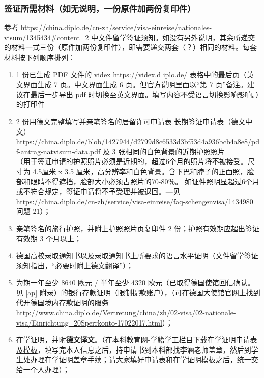 \documentclass{article}
\begin{document}
\subsubsection{签证所需材料（如无说明，一份原件加两份复印件）}\label{sec:visa-material}
参考 \url{https://china.diplo.de/cn-zh/service/visa-einreise/nationales-visum/1345434#content_2} 中文件\href{https://china.diplo.de/blob/1341652/6085aece6f28eb2e16b4d851c3632005/pdf-merkblatt-natvisum-studium-data.pdf}{留学签证须知}。如没有另外说明，其余所递交的材料一式三份（原件加两份复印件），即需要递交两套（？）相同的材料。每套材料按下列顺序排列：
\begin{enumerate}
\item 1 份已生成 PDF 文件的 videx \url{https://videx.d
iplo.de/} 表格中的最后页（英文界面生成 7 页。中文界面生成 6 页。但官方说明里面以“第 7 页”备注。建议在最后一步导出 pdf 时切换至英文界面。填写内容不受语言切换影响影响。）的打印件
\item 2 份用德文完整填写并亲笔签名的居留许可\underline{申请表}%
长期签证申请表（德文中文） \url{https://china.diplo.de/blob/1427944/d2799d8c6533d3bf53d4a936bcb4a8e8/pdf-antrag-natvisum-data.pdf} 及 3 张相同的白色背景的近期\underline{护照照片}\\
（用于签证申请的护照照片必须是近期的，超过6个月的照片将不被接受。尺寸为 4.5厘米 x 3.5 厘米，高分辨率和白色背景。含下巴和脖子的正面照，脸部和眼睛不得遮挡，脸部大小必须占照片的70-80％。
如证件照明显超过6个月或不符合规定，签证申请将不予受理并被退回。---见 \url{https://china.diplo.de/cn-zh/service/visa-einreise/faq-schengenvisa/1434980} 问题 21）；
\item 亲笔签名的\underline{旅行护照}，并附上护照照片页复印件 2 份；护照有效期应超出签证有效期 3 个月以上；
\item 德国高校\underline{录取通知书}以及录取通知书上所要求的语言水平证明（文件\href{https://china.diplo.de/blob/1341652/6085aece6f28eb2e16b4d851c3632005/pdf-merkblatt-natvisum-studium-data.pdf}{留学签证须知}指出，“必要时附上德文翻译”）；
\item \sloppy 为期一年至少 8640 欧元 / 半年至少 4320 欧元（已取得德国使馆回信确认。见 \ref{ap} 附录）的银行存款证明（限制提款账户），（可在德国大使馆官网上找到代开德国境内存款证明的服务 \url{http://www.china.diplo.de/Vertretung/china/zh/02-visa/02-nationale-visa/Einrichtung_20Sperrkonto-17022017.html}）；
\item \underline{在学证明}，并附\textbf{德文译文}。（在本科教育网-学籍学工栏目下载\href{http://bkjy.ucas.ac.cn/index.php/jyjx/download/3619-2017-08-31-08-51-16}{在学证明申请表及模板}，填写完本人信息之后，持申请书到本科部找李涵老师盖章，然后到学生处办理在学证明盖章手续；请大家填好申请表和在学证明模板之后，统一交给一个人办理）；

\end{enumerate}
\end{document}
